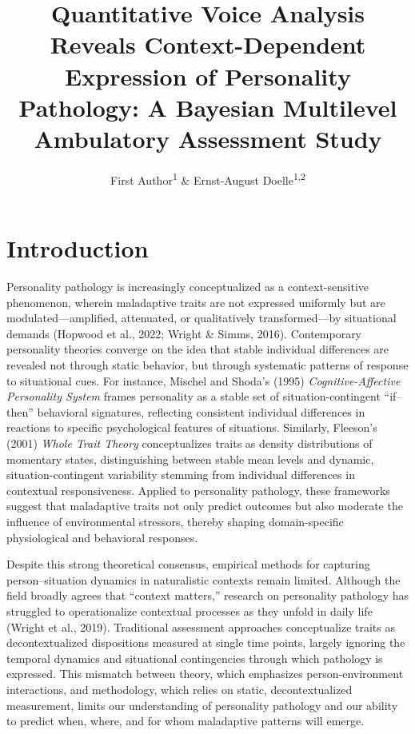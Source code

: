 \documentclass[
  english,
  man]{apa6}
\title{Quantitative Voice Analysis Reveals Context-Dependent Expression of Personality Pathology: A Bayesian Multilevel Ambulatory Assessment Study}
\author{First Author\textsuperscript{1} \& Ernst-August Doelle\textsuperscript{1,2}}
\date{}
\affiliation{\vspace{0.5cm}\textsuperscript{1} Wilhelm-Wundt-University\\\textsuperscript{2} Konstanz Business School}
\begin{document}
\maketitle

\section{Introduction}\label{introduction}

Personality pathology is increasingly conceptualized as a context-sensitive phenomenon, wherein maladaptive traits are not expressed uniformly but are modulated---amplified, attenuated, or qualitatively transformed---by situational demands (Hopwood et al., 2022; Wright \& Simms, 2016). Contemporary personality theories converge on the idea that stable individual differences are revealed not through static behavior, but through systematic patterns of response to situational cues. For instance, Mischel and Shoda's (1995) \emph{Cognitive-Affective Personality System} frames personality as a stable set of situation-contingent ``if--then'' behavioral signatures, reflecting consistent individual differences in reactions to specific psychological features of situations. Similarly, Fleeson's (2001) \emph{Whole Trait Theory} conceptualizes traits as density distributions of momentary states, distinguishing between stable mean levels and dynamic, situation-contingent variability stemming from individual differences in contextual responsiveness. Applied to personality pathology, these frameworks suggest that maladaptive traits not only predict outcomes but also moderate the influence of environmental stressors, thereby shaping domain-specific physiological and behavioral responses.

Despite this strong theoretical consensus, empirical methods for capturing person--situation dynamics in naturalistic contexts remain limited. Although the field broadly agrees that ``context matters,'' research on personality pathology has struggled to operationalize contextual processes as they unfold in daily life (Wright et al., 2019). Traditional assessment approaches conceptualize traits as decontextualized dispositions measured at single time points, largely ignoring the temporal dynamics and situational contingencies through which pathology is expressed. This mismatch between theory, which emphasizes person-environment interactions, and methodology, which relies on static, decontextualized measurement, limits our understanding of personality pathology and our ability to predict when, where, and for whom maladaptive patterns will emerge.
\end{document}
